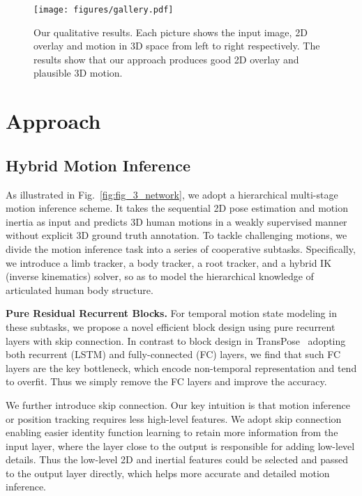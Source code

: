 \documentclass[letterpaper]{article} \usepackage{aaai23}  \usepackage{times}  \usepackage{helvet}  \usepackage{courier}  \usepackage[hyphens]{url}  \usepackage{graphicx} \urlstyle{rm} \def\UrlFont{\rm}  \usepackage{natbib}  \usepackage{caption} \frenchspacing  \setlength{\pdfpagewidth}{8.5in}  \setlength{\pdfpageheight}{11in}  \usepackage{algorithm}
\newcommand{\myparagraph}[1]{\vspace{0.1em}\noindent\textbf{#1}}
\begin{document}
 \begin{figure*}[th]
	\centering
	\texttt{[image: figures/gallery.pdf]}
	\caption{Our qualitative results. Each picture shows the input image, 2D overlay and motion in 3D space from left to right respectively. The results show that our approach produces good 2D overlay and plausible 3D motion.}
	\label{fig:gallery}
	\vspace{-1mm}
\end{figure*}

\section{Approach}
\subsection{Hybrid Motion Inference} \label{sec:mot_inference}
As illustrated in Fig.~\ref{fig:fig_3_network}, we adopt a hierarchical multi-stage motion inference scheme.
It takes the sequential 2D pose estimation and motion inertia as input and predicts 3D human motions in a weakly supervised manner without explicit 3D ground truth annotation.
To tackle challenging motions, we divide the motion inference task into a series of cooperative subtasks.
Specifically, we introduce a limb tracker, a body tracker, a root tracker, and a hybrid IK (inverse kinematics) solver, so as to model the hierarchical knowledge of articulated human body structure.


\myparagraph{Pure Residual Recurrent Blocks.}
For temporal motion state modeling in these subtasks, we propose a novel efficient block design using pure recurrent layers with skip connection.
In contrast to block design in TransPose~\cite{TransPose2021} adopting both recurrent (LSTM) and fully-connected (FC) layers, we find that such FC layers are the key bottleneck, which encode non-temporal representation and tend to overfit. 
Thus we simply remove the FC layers and improve the accuracy.

We further introduce skip connection. Our key intuition is that motion inference or position tracking requires less high-level features. We adopt skip connection enabling easier identity function learning to retain more information from the input layer, where the layer close to the output is responsible for adding low-level details.
Thus the low-level 2D and inertial features could be selected and passed to the output layer directly, which helps more accurate and detailed motion inference.
\end{document}
